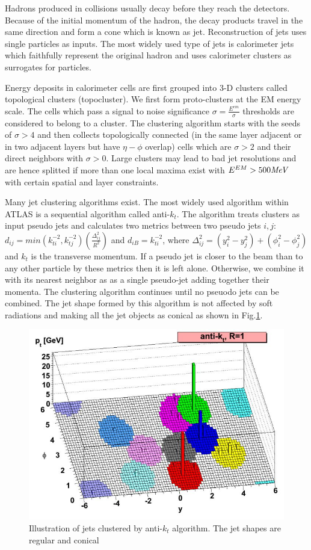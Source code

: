 \label{sec:reco-jets}
Hadrons produced in collisions usually decay before they reach the detectors. Because of the initial momentum of the hadron, the decay products travel in the same direction and form a cone which is known as jet. Reconstruction of jets uses single particles as inputs. The most widely used type of jets is calorimeter jets which faithfully represent the original hadron and uses calorimeter clusters as surrogates for particles.

Energy deposits in calorimeter cells are first grouped into 3-D clusters called topological clusters (topocluster)\cite{PERF-2014-07}. We first form proto-clusters at the EM energy scale. The cells which pass a signal to noise significance $\sigma=\frac{E^{em}}{\sigma}$ thresholds are considered to belong to a cluster. The clustering algorithm starts with the seeds of $\sigma>4$ and then collects topologically connected (in the same layer adjacent or in two adjacent layers but have $\eta- \phi$ overlap) cells which are $\sigma>2$ and their direct neighbors with $\sigma>0$. Large clusters may lead to bad jet resolutions and are hence splitted if more than one local maxima exist with $E^{EM}>500 \textit{MeV}$ with certain spatial and layer constraints.

Many jet clustering algorithms exist. The most widely used algorithm within ATLAS is a sequential algorithm called anti-$k_t$\cite{Cacciari:2008gp}. The algorithm treats clusters as input pseudo jets and calculates two metrics between two pseudo jets $i,j$: $d_{ij}=min(k^{-2}_{ti},k^{-2}_{tj})(\frac{\Delta^2_{ij}}{R^2})$ and $d_{iB}=k^{-2}_{ti}$, where $\Delta^2_{ij}=(y_i^2-y_j^2)+(\phi_i^2-\phi_j^2)$ and $k_t$ is the transverse momentum. If a pseudo jet is closer to the beam than to any other particle by these metrics then it is left alone. Otherwise, we combine it with its nearest neighbor as as a single pseudo-jet adding together their momenta. The clustering algorithm continues until no pseuodo jets can be combined. The jet shape formed by this algorithm is not affected by soft radiations and making all the jet objects as conical as shown in Fig.\ref{fig:reco-antikt}. 

\begin{figure}[htpb!]
\begin{center}
  \includegraphics[width=0.55\linewidth]{figures/Reco/Antikt}
\caption{Illustration of jets clustered by anti-$k_t$ algorithm. The jet shapes are regular and conical}
\label{fig:reco-antikt}
\end{center}
\end{figure}

